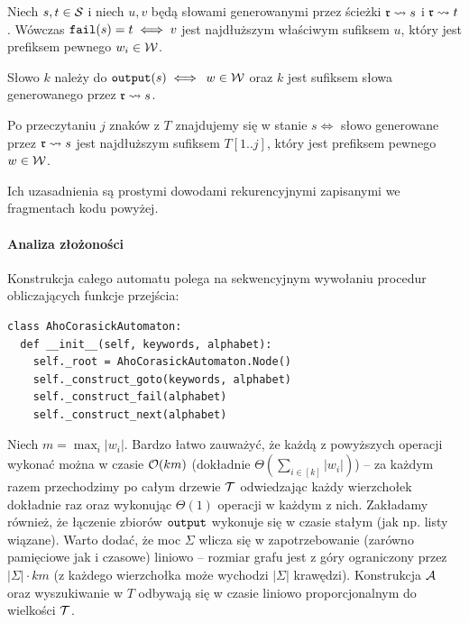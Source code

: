 \begin{lemma}{}{}
Niech $s,t\in\operatorname{\mathcal{S}}$ i niech $u, v$ będą słowami generowanymi przez ścieżki $\operatorname{\mathfrak{r}}\rightsquigarrow s$ i $\operatorname{\mathfrak{r}}\rightsquigarrow t$. Wówczas $\operatorname{\texttt{fail}}(s) = t \iff v$ jest najdłuższym właściwym sufiksem $u$, który jest prefiksem pewnego $w_i\in\operatorname{\mathcal{W}}$.
\end{lemma}

\begin{lemma}{}{}
Słowo $k$ należy do $\operatorname{\texttt{output}}(s)\iff$ $w\in\operatorname{\mathcal{W}}$ oraz $k$ jest sufiksem słowa generowanego przez $\operatorname{\mathfrak{r}}\rightsquigarrow s$.
\end{lemma}

\begin{lemma}{}{}
Po przeczytaniu $j$ znaków z $T$ znajdujemy się w stanie $s\iff$ słowo generowane przez $\operatorname{\mathfrak{r}}\rightsquigarrow s$ jest najdłuższym sufiksem $T[1..j]$, który jest prefiksem pewnego $w\in\operatorname{\mathcal{W}}$.
\end{lemma}

\noindent Ich uzasadnienia są prostymi dowodami rekurencyjnymi zapisanymi we fragmentach kodu powyżej.

\paragraph{Analiza złożoności}
Konstrukcja całego automatu polega na sekwencyjnym wywołaniu procedur obliczających funkcje przejścia:

\begin{verbatim}
class AhoCorasickAutomaton:
  def __init__(self, keywords, alphabet):
    self._root = AhoCorasickAutomaton.Node()
    self._construct_goto(keywords, alphabet)
    self._construct_fail(alphabet)
    self._construct_next(alphabet)
\end{verbatim}

Niech $m=\max_i |w_i|$. Bardzo łatwo zauważyć, że każdą z powyższych operacji wykonać można w czasie $\operatorname{\mathcal{O}}(km)$ (dokładnie $\Theta(\sum_{i\in[k]}|w_i|)$) -- za każdym razem przechodzimy po całym drzewie $\operatorname{\mathcal{T}}$ odwiedzając każdy wierzchołek dokładnie raz oraz wykonując $\Theta(1)$ operacji w każdym z nich. Zakładamy również, że łączenie zbiorów $\operatorname{\texttt{output}}$ wykonuje się w czasie stałym (jak np. listy wiązane). Warto dodać, że moc $\Sigma$ wlicza się w zapotrzebowanie (zarówno pamięciowe jak i czasowe) liniowo -- rozmiar grafu jest z góry ograniczony przez $|\Sigma|\cdot km$ (z każdego wierzchołka może wychodzi $|\Sigma|$ krawędzi). Konstrukcja $\operatorname{\mathcal{A}}$ oraz wyszukiwanie w $T$ odbywają się w czasie liniowo proporcjonalnym do wielkości $\operatorname{\mathcal{T}}$.

